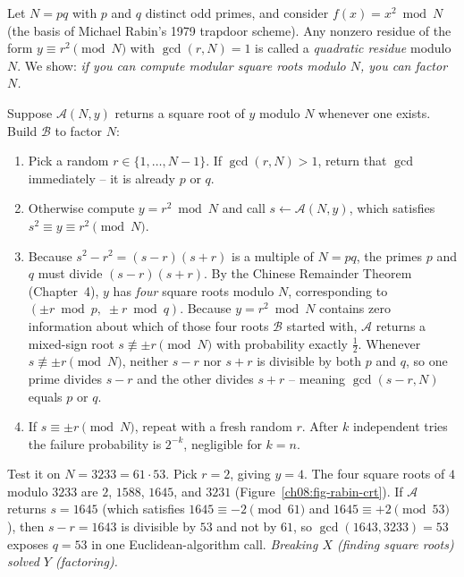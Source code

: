 \begin{example}
\label{ch08:ex-rabin}
Let $N=pq$ with $p$ and $q$ distinct odd primes, and consider $f(x)=x^{2}\bmod N$ (the basis of Michael Rabin's 1979 trapdoor scheme). Any nonzero residue of the form $y \equiv r^2 \pmod N$ with $\gcd(r,N)=1$ is called a \emph{quadratic residue} modulo $N$. We show: \emph{if you can compute modular square roots modulo $N$, you can factor $N$.}

Suppose $\mathcal A(N,y)$ returns a square root of $y$ modulo $N$ whenever one exists. Build $\mathcal B$ to factor $N$:
\begin{enumerate}
\item Pick a random $r \in \{1,\dots,N-1\}$. If $\gcd(r,N) > 1$, return that $\gcd$ immediately -- it is already $p$ or $q$.
\item Otherwise compute $y = r^{2}\bmod N$ and call $s \gets \mathcal A(N,y)$, which satisfies $s^{2}\equiv y \equiv r^{2} \pmod N$.
\item Because $s^{2} - r^{2} = (s-r)(s+r)$ is a multiple of $N = pq$, the primes $p$ and $q$ must divide $(s-r)(s+r)$. By the Chinese Remainder Theorem (Chapter~4), $y$ has \emph{four} square roots modulo $N$, corresponding to $(\pm r \bmod p,\; \pm r \bmod q)$. Because $y = r^2 \bmod N$ contains zero information about which of those four roots $\mathcal B$ started with, $\mathcal A$ returns a mixed-sign root $s \not\equiv \pm r \pmod N$ with probability exactly $\tfrac{1}{2}$. Whenever $s \not\equiv \pm r \pmod N$, neither $s - r$ nor $s + r$ is divisible by both $p$ and $q$, so one prime divides $s - r$ and the other divides $s + r$ -- meaning $\gcd(s - r, N)$ equals $p$ or $q$.
\item If $s \equiv \pm r \pmod N$, repeat with a fresh random $r$. After $k$ independent tries the failure probability is $2^{-k}$, negligible for $k = n$.
\end{enumerate}
Test it on $N=3233=61\cdot 53$. Pick $r=2$, giving $y = 4$. The four square roots of $4$ modulo $3233$ are $2$, $1588$, $1645$, and $3231$ (Figure~\ref{ch08:fig-rabin-crt}). If $\mathcal A$ returns $s = 1645$ (which satisfies $1645 \equiv -2 \pmod{61}$ and $1645 \equiv +2 \pmod{53}$), then $s - r = 1643$ is divisible by $53$ and not by $61$, so $\gcd(1643, 3233) = 53$ exposes $q = 53$ in one Euclidean-algorithm call. \emph{Breaking $X$ (finding square roots) solved $Y$ (factoring).}
\end{example}

